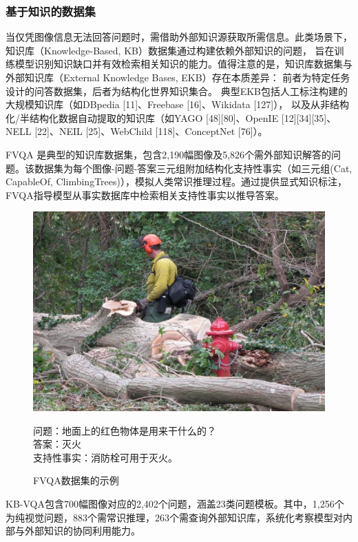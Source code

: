 \subsubsection{基于知识的数据集}
当仅凭图像信息无法回答问题时，需借助外部知识源获取所需信息。此类场景下，知识库（Knowledge-Based, KB）数据集通过构建依赖外部知识的问题，
旨在训练模型识别知识缺口并有效检索相关知识的能力。值得注意的是，知识库数据集与外部知识库（External Knowledge Bases, EKB）存在本质差异：
前者为特定任务设计的问答数据集，后者为结构化世界知识集合。
典型EKB包括人工标注构建的大规模知识库（如DBpedia [11]、Freebase [16]、Wikidata [127]），
以及从非结构化/半结构化数据自动提取的知识库（如YAGO [48][80]、OpenIE [12][34][35]、NELL [22]、NEIL [25]、WebChild [118]、ConceptNet [76]）。

FVQA\cite{wang2017fvqa} 是典型的知识库数据集，包含2,190幅图像及5,826个需外部知识解答的问题。该数据集为每个图像-问题-答案三元组附加结构化支持性事实（如三元组(Cat, CapableOf, ClimbingTrees)），模拟人类常识推理过程。通过提供显式知识标注，FVQA指导模型从事实数据库中检索相关支持性事实以推导答案。
\begin{figure}[h]
    \centering
    \includegraphics[scale=0.28]{figures/FTVQA.png}
    \begin{center}
        \footnotesize 问题：地面上的红色物体是用来干什么的？\\
        \footnotesize 答案：灭火\\
        \footnotesize 支持性事实：消防栓可用于灭火。
    \end{center}
    \caption{FVQA数据集的示例}
    \label{fig:fvqa-example}
\end{figure}
KB-VQA\cite{wang2015explicit}包含700幅图像对应的2,402个问题，涵盖23类问题模板。其中，1,256个为纯视觉问题，883个需常识推理，263个需查询外部知识库，系统化考察模型对内部与外部知识的协同利用能力。

